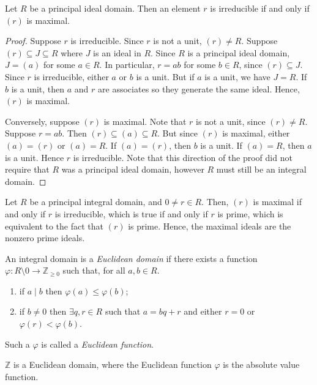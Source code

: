 \begin{lemma}
	Let $R$ be a principal ideal domain.
	Then an element $r$ is irreducible if and only if $(r)$ is maximal.
\end{lemma}
\begin{proof}
	Suppose $r$ is irreducible.
	Since $r$ is not a unit, $(r) \neq R$.
	Suppose $(r) \subseteq J \subseteq R$ where $J$ is an ideal in $R$.
	Since $R$ is a principal ideal domain, $J = (a)$ for some $a \in R$.
	In particular, $r = ab$ for some $b \in R$, since $(r) \subseteq J$.
	Since $r$ is irreducible, either $a$ or $b$ is a unit.
	But if $a$ is a unit, we have $J = R$.
	If $b$ is a unit, then $a$ and $r$ are associates so they generate the same ideal.
	Hence, $(r)$ is maximal.

	Conversely, suppose $(r)$ is maximal.
	Note that $r$ is not a unit, since $(r) \neq R$.
	Suppose $r = ab$.
	Then $(r) \subseteq (a) \subseteq R$.
	But since $(r)$ is maximal, either $(a) = (r)$ or $(a) = R$.
	If $(a) = (r)$, then $b$ is a unit.
	If $(a) = R$, then $a$ is a unit.
	Hence $r$ is irreducible.
	Note that this direction of the proof did not require that $R$ was a principal ideal domain, however $R$ must still be an integral domain.
\end{proof}
\begin{remark}
	Let $R$ be a principal integral domain, and $0 \neq r \in R$.
	Then, $(r)$ is maximal if and only if $r$ is irreducible, which is true if and only if $r$ is prime, which is equivalent to the fact that $(r)$ is prime.
	Hence, the maximal ideals are the nonzero prime ideals.
\end{remark}
\begin{definition}
	An integral domain is a \textit{Euclidean domain} if there exists a function $\varphi \colon R \setminus \qty{0} \to \mathbb Z_{\geq 0}$ such that, for all $a, b \in R$.
	\begin{enumerate}
		\item if $a \mid b$ then $\varphi(a) \leq \varphi(b)$;
		\item if $b \neq 0$ then $\exists q, r \in R$ such that $a = bq + r$ and either $r = 0$ or $\varphi(r) < \varphi(b)$.
	\end{enumerate}
	Such a $\varphi$ is called a \textit{Euclidean function}.
\end{definition}
\begin{example}
	$\mathbb Z$ is a Euclidean domain, where the Euclidean function $\varphi$ is the absolute value function.
\end{example}
